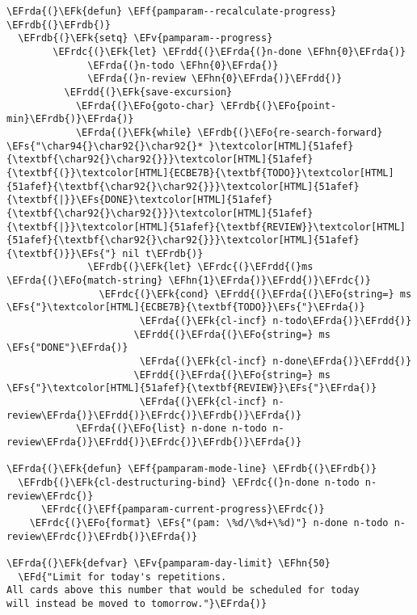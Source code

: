 \documentclass[a4wide,10pt]{article}
\newcommand{\EFs}[1]{\textcolor{EFs}{#1}} %
\newcommand{\EFd}[1]{\textcolor{EFd}{#1}} %
\newcommand{\EFk}[1]{\textcolor{EFk}{#1}} %
\newcommand{\EFf}[1]{\textcolor{EFf}{#1}} %
\newcommand{\EFv}[1]{\textcolor{EFv}{#1}} %
\newcommand{\EFo}[1]{\textcolor{EFo}{#1}} %
\newcommand{\EFhn}[1]{\textcolor{EFhn}{\textbf{#1}}} %
\newcommand{\EFrda}[1]{\textcolor{EFrda}{#1}} %
\newcommand{\EFrdb}[1]{\textcolor{EFrdb}{#1}} %
\newcommand{\EFrdc}[1]{\textcolor{EFrdc}{#1}} %
\newcommand{\EFrdd}[1]{\textcolor{EFrdd}{#1}} %
\begin{document}
\begin{Code}
\begin{Verbatim}
\EFrda{(}\EFk{defun} \EFf{pamparam--recalculate-progress} \EFrdb{(}\EFrdb{)}
  \EFrdb{(}\EFk{setq} \EFv{pamparam--progress}
        \EFrdc{(}\EFk{let} \EFrdd{(}\EFrda{(}n-done \EFhn{0}\EFrda{)}
              \EFrda{(}n-todo \EFhn{0}\EFrda{)}
              \EFrda{(}n-review \EFhn{0}\EFrda{)}\EFrdd{)}
          \EFrdd{(}\EFk{save-excursion}
            \EFrda{(}\EFo{goto-char} \EFrdb{(}\EFo{point-min}\EFrdb{)}\EFrda{)}
            \EFrda{(}\EFk{while} \EFrdb{(}\EFo{re-search-forward} \EFs{"\char94{}\char92{}\char92{}* }\textcolor[HTML]{51afef}{\textbf{\char92{}\char92{}}}\textcolor[HTML]{51afef}{\textbf{(}}\textcolor[HTML]{ECBE7B}{\textbf{TODO}}\textcolor[HTML]{51afef}{\textbf{\char92{}\char92{}}}\textcolor[HTML]{51afef}{\textbf{|}}\EFs{DONE}\textcolor[HTML]{51afef}{\textbf{\char92{}\char92{}}}\textcolor[HTML]{51afef}{\textbf{|}}\textcolor[HTML]{51afef}{\textbf{REVIEW}}\textcolor[HTML]{51afef}{\textbf{\char92{}\char92{}}}\textcolor[HTML]{51afef}{\textbf{)}}\EFs{"} nil t\EFrdb{)}
              \EFrdb{(}\EFk{let} \EFrdc{(}\EFrdd{(}ms \EFrda{(}\EFo{match-string} \EFhn{1}\EFrda{)}\EFrdd{)}\EFrdc{)}
                \EFrdc{(}\EFk{cond} \EFrdd{(}\EFrda{(}\EFo{string=} ms \EFs{"}\textcolor[HTML]{ECBE7B}{\textbf{TODO}}\EFs{"}\EFrda{)}
                       \EFrda{(}\EFk{cl-incf} n-todo\EFrda{)}\EFrdd{)}
                      \EFrdd{(}\EFrda{(}\EFo{string=} ms \EFs{"DONE"}\EFrda{)}
                       \EFrda{(}\EFk{cl-incf} n-done\EFrda{)}\EFrdd{)}
                      \EFrdd{(}\EFrda{(}\EFo{string=} ms \EFs{"}\textcolor[HTML]{51afef}{\textbf{REVIEW}}\EFs{"}\EFrda{)}
                       \EFrda{(}\EFk{cl-incf} n-review\EFrda{)}\EFrdd{)}\EFrdc{)}\EFrdb{)}\EFrda{)}
            \EFrda{(}\EFo{list} n-done n-todo n-review\EFrda{)}\EFrdd{)}\EFrdc{)}\EFrdb{)}\EFrda{)}

\EFrda{(}\EFk{defun} \EFf{pamparam-mode-line} \EFrdb{(}\EFrdb{)}
  \EFrdb{(}\EFk{cl-destructuring-bind} \EFrdc{(}n-done n-todo n-review\EFrdc{)}
      \EFrdc{(}\EFf{pamparam-current-progress}\EFrdc{)}
    \EFrdc{(}\EFo{format} \EFs{"(pam: \%d/\%d+\%d)"} n-done n-todo n-review\EFrdc{)}\EFrdb{)}\EFrda{)}

\EFrda{(}\EFk{defvar} \EFv{pamparam-day-limit} \EFhn{50}
  \EFd{"Limit for today's repetitions.
All cards above this number that would be scheduled for today
will instead be moved to tomorrow."}\EFrda{)}


\end{Verbatim}
\end{Code}
\end{document}
